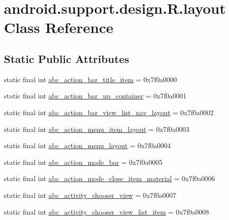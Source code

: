 \hypertarget{classandroid_1_1support_1_1design_1_1R_1_1layout}{}\section{android.\+support.\+design.\+R.\+layout Class Reference}
\label{classandroid_1_1support_1_1design_1_1R_1_1layout}
\subsection*{Static Public Attributes}
\begin{DoxyCompactItemize}
\item 
static final int \mbox{\hyperlink{classandroid_1_1support_1_1design_1_1R_1_1layout_a531b33a0bb0538dd1d077ef414f13912}{abc\+\_\+action\+\_\+bar\+\_\+title\+\_\+item}} = 0x7f0a0000
\item 
static final int \mbox{\hyperlink{classandroid_1_1support_1_1design_1_1R_1_1layout_a65ed125f76e124be64ba517ed6388a2f}{abc\+\_\+action\+\_\+bar\+\_\+up\+\_\+container}} = 0x7f0a0001
\item 
static final int \mbox{\hyperlink{classandroid_1_1support_1_1design_1_1R_1_1layout_a079dfdfef917e52dcfe6fe5f09bbb311}{abc\+\_\+action\+\_\+bar\+\_\+view\+\_\+list\+\_\+nav\+\_\+layout}} = 0x7f0a0002
\item 
static final int \mbox{\hyperlink{classandroid_1_1support_1_1design_1_1R_1_1layout_aa31161c408085d6a0ce8b75edb2821bf}{abc\+\_\+action\+\_\+menu\+\_\+item\+\_\+layout}} = 0x7f0a0003
\item 
static final int \mbox{\hyperlink{classandroid_1_1support_1_1design_1_1R_1_1layout_a950d7d0ec60597ed0fceff4da4d8a6ee}{abc\+\_\+action\+\_\+menu\+\_\+layout}} = 0x7f0a0004
\item 
static final int \mbox{\hyperlink{classandroid_1_1support_1_1design_1_1R_1_1layout_a4ed2ccdae8bbfabdb968a36d217cfb5e}{abc\+\_\+action\+\_\+mode\+\_\+bar}} = 0x7f0a0005
\item 
static final int \mbox{\hyperlink{classandroid_1_1support_1_1design_1_1R_1_1layout_acf611bbfd39d0104f58774f7799a59c0}{abc\+\_\+action\+\_\+mode\+\_\+close\+\_\+item\+\_\+material}} = 0x7f0a0006
\item 
static final int \mbox{\hyperlink{classandroid_1_1support_1_1design_1_1R_1_1layout_a43a54b73c3cfb776e7a50094cc91b8c1}{abc\+\_\+activity\+\_\+chooser\+\_\+view}} = 0x7f0a0007
\item 
static final int \mbox{\hyperlink{classandroid_1_1support_1_1design_1_1R_1_1layout_aadf7a74bdcfcc0214b577ca8912b47d1}{abc\+\_\+activity\+\_\+chooser\+\_\+view\+\_\+list\+\_\+item}} = 0x7f0a0008

\end{DoxyCompactItemize}
